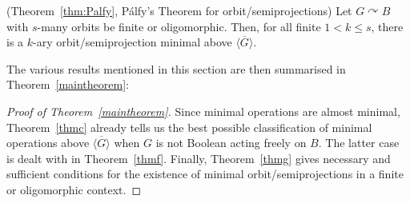 \documentclass{article}
\newenvironment{customthm}[1]
  {\renewcommand\theinnercustomthm{#1}\innercustomthm}
  {\endinnercustomthm}
\theoremstyle{remark}
\theoremstyle{definition}
\def\acts{\curvearrowright}
\begin{document}
\begin{customthm}{G}(Theorem~\ref{thm:Palfy}, P\'{a}lfy's Theorem for orbit\-/semiprojections) \label{thmg} Let $G\acts B$ with $s$-many orbits be finite or oligomorphic. Then, for all finite $1<k\leq s$, there is a $k$-ary orbit\-/semiprojection minimal above $\overline{\langle G\rangle}$.
\end{customthm}

The various results mentioned in this section are then summarised in Theorem~\ref{maintheorem}:

\begin{proof}[Proof of Theorem~\ref{maintheorem}] Since minimal operations are almost minimal, Theorem~\ref{thmc} already tells us the best possible classification of minimal operations above $\overline{\langle G\rangle}$ when $G$ is not Boolean acting freely on $B$. The latter case is dealt with in Theorem~\ref{thmf}. Finally, Theorem~\ref{thmg} gives necessary and sufficient conditions for the existence of minimal orbit\-/semiprojections in a finite or oligomorphic context.
\end{proof}
\end{document}
